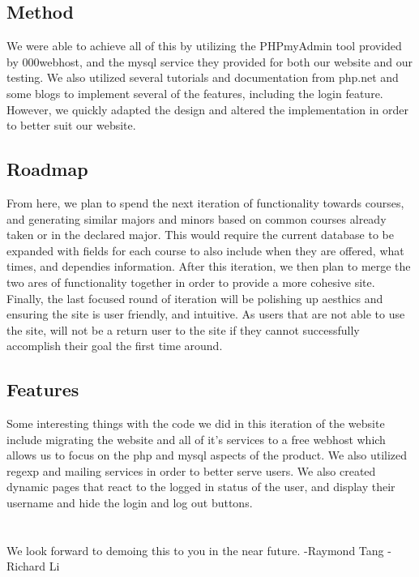 \documentclass{article}
\begin{document}
\begin{doublespace}
\subsection*{Method}
\indent We were able to achieve all of this by utilizing the PHPmyAdmin tool provided by 000webhost, and the mysql service they provided for both our website and our testing. We also utilized several tutorials and documentation from php.net and some blogs to implement several of the features, including the login feature. However, we quickly adapted the design and altered the implementation in order to better suit our website.

\subsection*{Roadmap}
\indent From here, we plan to spend the next iteration of functionality towards courses, and generating similar majors and minors based on common courses already taken or in the declared major. This would require the current database to be expanded with fields for each course to also include when they are offered, what times, and dependies information. After this iteration, we then plan to merge the two ares of functionality together in order to provide a more cohesive site. Finally, the last focused round of iteration will be polishing up aesthics and ensuring the site is user friendly, and intuitive. As users that are not able to use the site, will not be a return user to the site if they cannot successfully accomplish their goal the first time around.

\subsection*{Features}
\indent Some interesting things with the code we did in this iteration of the website include migrating the website and all of it's services to a free webhost which allows us to focus on the php and mysql aspects of the product. We also utilized regexp and mailing services in order to better serve users. We also created dynamic pages that react to the logged in status of the user, and display their username and hide the login and log out buttons.
\\
\\
\\
We look forward to demoing this to you in the near future.
-Raymond Tang
-Richard Li


\end{doublespace}
\end{document}
